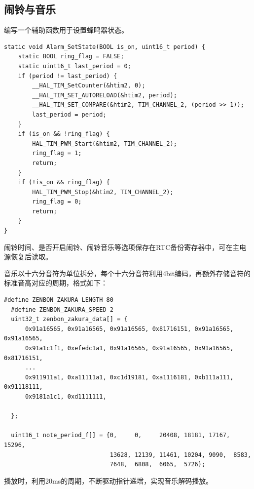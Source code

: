 \documentclass[a4paper,11pt,UTF8]{ctexart}
\begin{document}
\subsection{闹铃与音乐}

编写一个辅助函数用于设置蜂鸣器状态。

\begin{lstlisting}[caption={设置闹铃状态},captionpos=b]
static void Alarm_SetState(BOOL is_on, uint16_t period) {
    static BOOL ring_flag = FALSE;
    static uint16_t last_period = 0;
    if (period != last_period) {
        __HAL_TIM_SetCounter(&htim2, 0);
        __HAL_TIM_SET_AUTORELOAD(&htim2, period);
        __HAL_TIM_SET_COMPARE(&htim2, TIM_CHANNEL_2, (period >> 1));
        last_period = period;
    }
    if (is_on && !ring_flag) {
        HAL_TIM_PWM_Start(&htim2, TIM_CHANNEL_2);
        ring_flag = 1;
        return;
    }
    if (!is_on && ring_flag) {
        HAL_TIM_PWM_Stop(&htim2, TIM_CHANNEL_2);
        ring_flag = 0;
        return;
    }
}
\end{lstlisting}

闹铃时间、是否开启闹铃、闹铃音乐等选项保存在RTC备份寄存器中，可在主电源恢复后读取。

音乐以十六分音符为单位拆分，每个十六分音符利用4bit编码，再额外存储音符的标准音高对应的周期，格式如下：

\begin{lstlisting}[caption={音乐存储格式},captionpos=b]
  #define ZENBON_ZAKURA_LENGTH 80
  #define ZENBON_ZAKURA_SPEED 2
  uint32_t zenbon_zakura_data[] = {
      0x91a16565, 0x91a16565, 0x91a16565, 0x81716151, 0x91a16565, 0x91a16565,
      0x91a1c1f1, 0xefedc1a1, 0x91a16565, 0x91a16565, 0x91a16565, 0x81716151,
      ...
      0x911911a1, 0xa11111a1, 0xc1d19181, 0xa1116181, 0xb111a111, 0x91118111,
      0x9181a1c1, 0xd1111111,
  
  };
  
  uint16_t note_period_f[] = {0,     0,     20408, 18181, 17167, 15296,
                              13628, 12139, 11461, 10204, 9090,  8583,
                              7648,  6808,  6065,  5726};
\end{lstlisting}

播放时，利用20ms的周期，不断驱动指针递增，实现音乐解码播放。
\end{document}
